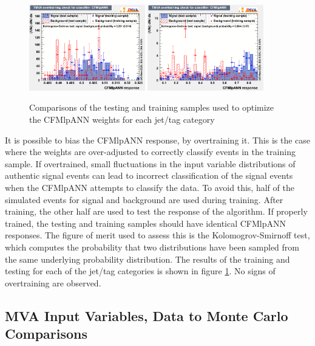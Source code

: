\begin{figure}[hbtp]
\begin{center}
   \includegraphics[width=0.45\textwidth]{Figures/Analysis_1_Diagrams/overtrain_CFMlpANN_5j4ormoret.png}
   \includegraphics[width=0.45\textwidth]{Figures/Analysis_1_Diagrams/overtrain_CFMlpANN_6ormorej4ormoret.png}
      \caption{Comparisons of the testing and training samples used to
      optimize the CFMlpANN weights for each jet/tag category}
   \label{fig:ann_testTrain}
 \end{center}
\end{figure}

\par It is possible to bias the CFMlpANN response, by overtraining
it.  This is the case where the weights are over-adjusted to correctly
classify events in the training sample.  If overtrained, small
fluctuations in the input variable distributions of authentic signal
events can lead to incorrect classification of the signal events when
the CFMlpANN attempts to classify the data.  To avoid this, half of
the simulated events for \ttH signal and \ttjets background are used
during training.  After training, the other half are used to test the
response of the algorithm.  If properly trained, the testing and
training samples should have identical CFMlpANN responses.  The figure
of merit used to assess this is the Kolomogrov-Smirnoff test, which
computes the probability that two distributions have been sampled from
the same underlying probability distribution.  The results of the
training and testing for each of the jet/tag categories is shown in
figure \ref{fig:ann_testTrain}.  No signs of overtraining are observed.


\subsection{MVA Input Variables, Data to Monte Carlo Comparisons}
\label{mva_input_vars_data_to_mc_overview}

